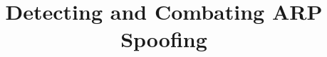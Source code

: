 \documentclass{acm_proc_article-sp}
\begin{document}
\title{Detecting and Combating ARP Spoofing}
%
%
%
%
%
\end{document}
